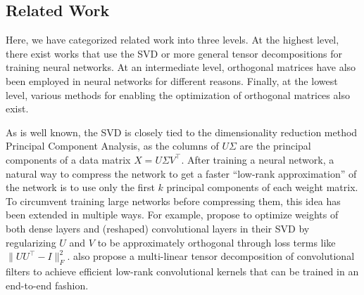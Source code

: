 \documentclass[11pt,a4paper,twoside,openright,final]{memoir}
\begin{document}
\subsection{Related Work}
Here, we have categorized related work into three levels.
At the highest level, there exist works that use the SVD or more general tensor decompositions for training neural networks.
At an intermediate level, orthogonal matrices have also been employed in neural networks for different reasons.
Finally, at the lowest level, various methods for enabling the optimization of orthogonal matrices also exist.

As is well known, the SVD is closely tied to the dimensionality reduction method Principal Component Analysis, as the columns of $U\Sigma$ are the principal components of a data matrix $X = U \Sigma V^\intercal$.
After training a neural network, a natural way to compress the network to get a faster ``low-rank approximation'' of the network is to use only the first $k$ principal components of each weight matrix.
To circumvent training large networks before compressing them, this idea has been extended in multiple ways.
For example, \citet{training-svd-regularized} propose to optimize weights of both dense layers and (reshaped) convolutional layers in their SVD by regularizing $U$ and $V$ to be approximately orthogonal through loss terms like $\|UU^\intercal-I\|_F^2$.
\citet{convolution-tensor-decomposition} also propose a multi-linear tensor decomposition of convolutional filters to achieve efficient low-rank convolutional kernels that can be trained in an end-to-end fashion.
\end{document}
